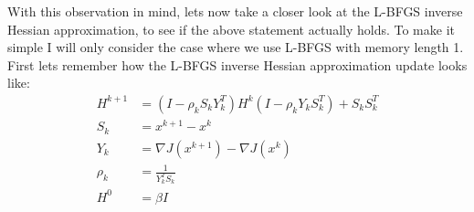 \documentclass[11pt,a4paper]{article}
\begin{document}
With this observation in mind, lets now take a closer look at the L-BFGS inverse Hessian approximation, to see if the above statement actually holds. To make it simple I will only consider the case where we use L-BFGS with memory length 1. First lets remember how the L-BFGS inverse Hessian approximation update looks like:
\begin{align*}
H^{k+1} &= (I-\rho_kS_kY_k^T)H^k(I-\rho_kY_kS_k^T) + S_kS_k^T\\
S_k &= x^{k+1}-x^{k} \\
Y_k &= \nabla J(x^{k+1})-\nabla J(x^{k})\\
\rho_k &= \frac{1}{Y_k^TS_k} \\
H^0 &= \beta I
\end{align*}
\end{document}
